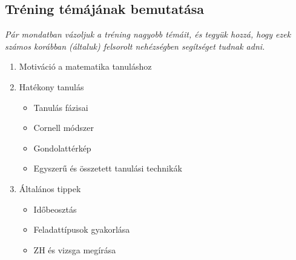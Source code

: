 \documentclass[../Main.tex]{subfiles}
\begin{document}
\subsection{Tréning témájának bemutatása}

\textit{Pár mondatban vázoljuk a tréning nagyobb témáit, és tegyük hozzá, hogy ezek számos korábban (általuk)
felsorolt nehézségben segítséget tudnak adni.}

\begin{enumerate}
    \item Motiváció a matematika tanuláshoz
    \item Hatékony tanulás
    \begin{itemize}
        \item Tanulás fázisai
        \item Cornell módszer
        \item Gondolattérkép
        \item Egyszerű és összetett tanulási technikák
    \end{itemize}
    \item Általános tippek
    \begin{itemize}
        \item Időbeosztás
        \item Feladattípusok gyakorlása
        \item ZH és vizsga megírása
    \end{itemize}
\end{enumerate}
\end{document}
